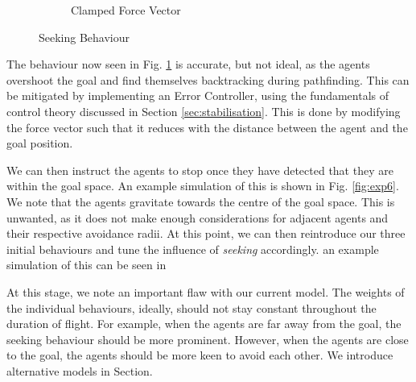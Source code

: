 \documentclass[12pt]{article}
\begin{document}
\begin{figure}[H]
\begin{subfigure}{.45\textwidth}
\caption{Clamped Force Vector}
\label{fig:exp5}
\end{subfigure}
\caption{Seeking Behaviour}
\label{fig:exp45}
\end{figure}

The behaviour now seen in Fig. \ref{fig:exp5} is accurate, but not ideal, as the agents overshoot the goal and find themselves backtracking during pathfinding. This can be mitigated by implementing an Error Controller, using the fundamentals of control theory discussed in Section \ref{sec:stabilisation}. This is done by modifying the force vector such that it reduces with the distance between the agent and the goal position.

We can then instruct the agents to stop once they have detected that they are within the goal space. An example simulation of this is shown in Fig. \ref{fig:exp6}. We note that the agents gravitate towards the centre of the goal space. This is unwanted, as it does not make enough considerations for adjacent agents and their respective avoidance radii. At this point, we can then reintroduce our three initial behaviours and tune the influence of \emph{seeking} accordingly. an example simulation of this can be seen in

At this stage, we note an important flaw with our current model. The weights of the individual behaviours, ideally, should not stay constant throughout the duration of flight. For example, when the agents are far away from the goal, the seeking behaviour should be more prominent. However, when the agents are close to the goal, the agents should be more keen to avoid each other. We introduce alternative models in Section.
\end{document}
